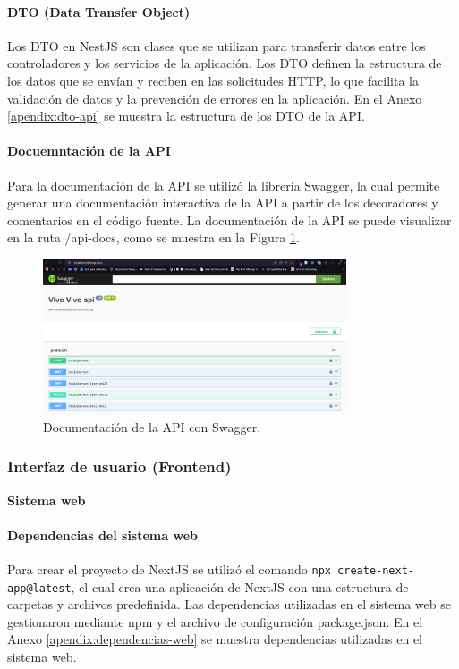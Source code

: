 \paragraph{DTO (Data Transfer Object)}
Los DTO en NestJS son clases que se utilizan para transferir datos entre los controladores y los servicios de la aplicación. Los DTO definen la
estructura de los datos que se envían y reciben en las solicitudes HTTP, lo que facilita la validación de datos y la prevención de errores en la
aplicación. En el Anexo \ref{apendix:dto-api} se muestra la estructura de los DTO de la API.

\paragraph{Docuemntación de la API}
Para la documentación de la API se utilizó la librería Swagger, la cual permite generar una documentación interactiva de la API a partir de los
decoradores y comentarios en el código fuente. La documentación de la API se puede visualizar en la ruta /api-docs, como se muestra en la Figura
\ref{fih:documentacion-api}.

\begin{figure}[H]
    \centering
    \includegraphics[width=0.8\textwidth]{chapters/III-resultados-y-discusion/resources/images/documentacion-api.png}
    \caption{Documentación de la API con Swagger.}
    \label{fih:documentacion-api}
\end{figure}

\subsubsection{Interfaz de usuario (Frontend)}

\textbf{Sistema web}
\bigbreak

\paragraph{Dependencias del sistema web}
Para crear el proyecto de NextJS se utilizó el comando \texttt{npx create-next-app@latest}, el cual crea una aplicación de
NextJS con una estructura de carpetas y archivos predefinida. Las dependencias utilizadas en el sistema web se gestionaron mediante
npm y el archivo de configuración package.json. En el Anexo \ref{apendix:dependencias-web} se muestra dependencias utilizadas en el
sistema web.

